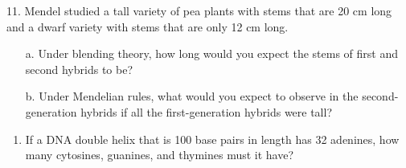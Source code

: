 \documentclass[11pt,]{article}
\providecommand{\tightlist}{%
  \setlength{\itemsep}{0pt}\setlength{\parskip}{0pt}}
\begin{document}
\begin{blackbox}

11. Mendel studied a tall variety of pea plants with stems that are 20 cm long and a dwarf variety with stems that are only 12 cm long. \begin{enumerate} 
 \item[a.]{ Under blending theory, how long would you expect the stems of first and second hybrids to be? } 
 \item[b.]{ Under Mendelian rules, what would you expect to observe in the second-generation hybrids if all the first-generation hybrids were tall? } 
 \end{enumerate}

\vspace{19cm}


\end{blackbox}

\begin{blackbox}

\begin{enumerate}
\def\labelenumi{\arabic{enumi}.}
\setcounter{enumi}{11}
\tightlist
\item
  If a DNA double helix that is 100 base pairs in length has 32
  adenines, how many cytosines, guanines, and thymines must it have?
\end{enumerate}

\vspace{19cm}

\end{blackbox}
\end{document}
